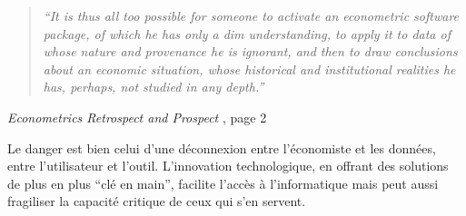 \begin{quote}
\begin{center}
\textit{“It is thus all too possible for someone to activate an econometric software package, of which he has only a dim understanding, to apply it to data of whose nature and provenance he is ignorant, and then to draw conclusions about an economic situation, whose historical and institutional realities he has, perhaps, not studied in any depth.”}
\end{center}
\end{quote} \hfill \textit{Econometrics Retrospect and Prospect }, page 2 \cite{johnstonEconometricsRetrospectProspect1991}


Le danger est bien celui d’une déconnexion entre l’économiste et les données, entre l’utilisateur et l’outil. L’innovation technologique, en offrant des solutions de plus en plus “clé en main”, facilite l’accès à l’informatique mais peut aussi fragiliser la capacité critique de ceux qui s’en servent.


